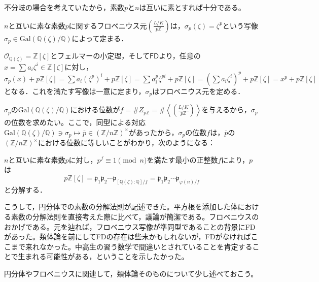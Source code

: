 不分岐の場合を考えていたから，素数$p$と$n$は互いに素とすれば十分である。
\begin{prop}
    $n$と互いに素な素数$p$に関するフロベニウス元$\left(\frac{L/K}{p\mathbb{Z}}\right)$は，$\sigma_p(\zeta)=\zeta^p$という写像$\sigma_p\in\mathrm{Gal}(\mathbb{Q}(\zeta)/\mathbb{Q})$によって定まる．
\end{prop}
\begin{prf}
    $\mathcal{O}_{\mathbb{Q}(\zeta)}=\mathbb{Z}[\zeta]$とフェルマーの小定理，そして$\mathsf{FD}$より，任意の$x=\sum a_i\zeta^i\in\mathbb{Z}[\zeta]$に対し，$\sigma_p(x)+p\mathbb{Z}[\zeta]=\sum a_i(\zeta^p)^i+p\mathbb{Z}[\zeta]=\sum a_i^p\zeta^{pi}+p\mathbb{Z}[\zeta]=(\sum a_i\zeta^i)^p+p\mathbb{Z}[\zeta]=x^p+p\mathbb{Z}[\zeta]$となる．これを満たす写像は一意に定まり，$\sigma_p$はフロベニウス元を定める．
\end{prf}
$\sigma_p$の$\mathrm{Gal}(\mathbb{Q}(\zeta)/\mathbb{Q})$における位数が$f=\# Z_{p\mathbb{Z}}=\#\left\langle\left(\frac{L/K}{p\mathbb{Z}}\right)\right\rangle$を与えるから，$\sigma_p$の位数を求めたい。ここで，同型による対応$\mathrm{Gal}(\mathbb{Q}(\zeta)/\mathbb{Q})\ni\sigma_p\mapsto\bar{p}\in (\mathbb{Z}/n\mathbb{Z})^{\times}$があったから，$\sigma_p$の位数$f$は，$\bar{p}$の$(\mathbb{Z}/n\mathbb{Z})^{\times}$における位数に等しいことがわかり，次のようになる：
\begin{thm}
    $n$と互いに素な素数$p$に対し，$p^f\equiv 1\pmod{n}$を満たす最小の正整数$f$により，$p$は\[
    p\mathbb{Z}[\zeta]=\mathfrak{p}_1\mathfrak{p}_2\cdots\mathfrak{p}_{[\mathbb{Q}(\zeta):\mathbb{Q}]/f}=\mathfrak{p}_1\mathfrak{p}_2\cdots\mathfrak{p}_{\varphi(n)/f}
    \]と分解する．
\end{thm}
こうして，円分体での素数の分解法則が記述できた。平方根を添加した体における素数の分解法則を直接考えた際に比べて，議論が簡潔である。フロベニウスのおかげである。元を辿れば，フロベニウス写像が準同型であることの背景に\textsf{FD}があった。類体論を前にして\textsf{FD}の存在は些末かもしれないが，\textsf{FD}がなければここまで来れなかった。中高生の習う数学で間違いとされていることを肯定することで生まれる可能性がある，ということを示したかった。

円分体やフロベニウスに関連して，類体論そのものについて少し述べておこう。


